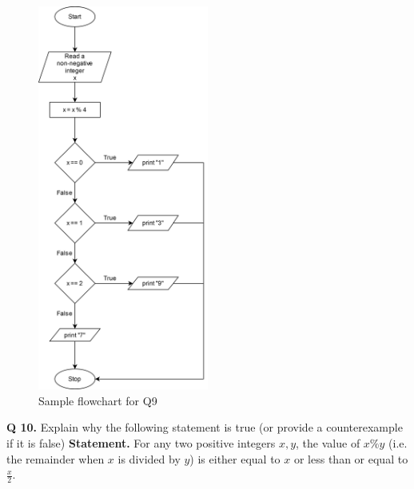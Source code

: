 \documentclass{article}
\begin{document}
\begin{figure}[ht]
    \centering
    \includegraphics[width=0.5\textwidth]{Q9.png}
    \caption{Sample flowchart for Q9}
    \label{Q9}
\end{figure}


\clearpage

\begin{flushleft}

\textbf{Q 10. } Explain why the following statement is true (or provide a counterexample if it is false) 
\linebreak
\textbf{Statement.} For any two positive integers $x, y$, the value of $x \% y$ (i.e. the remainder when 
$x$ is divided by $y$) is either equal to $x$ or less than or equal to $\frac{x}{2}$.

\end{flushleft}
\end{document}
